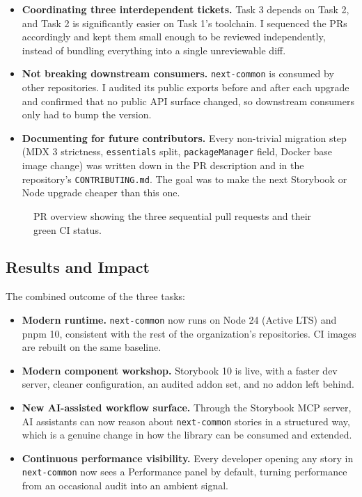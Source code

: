 \begin{itemize}
    \item \textbf{Coordinating three interdependent tickets.} Task 3 depends on Task 2, and Task 2 is significantly easier on Task 1's toolchain. I sequenced the PRs accordingly and kept them small enough to be reviewed independently, instead of bundling everything into a single unreviewable diff.
    \item \textbf{Not breaking downstream consumers.} \texttt{next-common} is consumed by other repositories. I audited its public exports before and after each upgrade and confirmed that no public API surface changed, so downstream consumers only had to bump the version.
    \item \textbf{Documenting for future contributors.} Every non-trivial migration step (MDX 3 strictness, \texttt{essentials} split, \texttt{packageManager} field, Docker base image change) was written down in the PR description and in the repository's \texttt{CONTRIBUTING.md}. The goal was to make the next Storybook or Node upgrade cheaper than this one.
\end{itemize}

\begin{figure}[h]
    \centering
    \caption{PR overview showing the three sequential pull requests and their green CI status.}
    \label{fig:x7-prs}
\end{figure}

\subsection{Results and Impact}

The combined outcome of the three tasks:

\begin{itemize}
    \item \textbf{Modern runtime.} \texttt{next-common} now runs on Node 24 (Active LTS) and pnpm 10, consistent with the rest of the organization's repositories. CI images are rebuilt on the same baseline.
    \item \textbf{Modern component workshop.} Storybook 10 is live, with a faster dev server, cleaner configuration, an audited addon set, and no addon left behind.
    \item \textbf{New AI-assisted workflow surface.} Through the Storybook MCP server, AI assistants can now reason about \texttt{next-common} stories in a structured way, which is a genuine change in how the library can be consumed and extended.
    \item \textbf{Continuous performance visibility.} Every developer opening any story in \texttt{next-common} now sees a Performance panel by default, turning performance from an occasional audit into an ambient signal.
\end{itemize}

